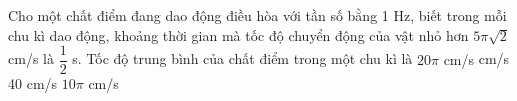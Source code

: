   \begin{ex}%
  	Cho một chất điểm đang dao động điều hòa với tần số bằng 1 Hz, biết trong mỗi chu kì dao động, khoảng thời gian mà tốc độ chuyển động của vật nhỏ hơn $5\pi\sqrt{2}$ cm/s là $\dfrac{1}{2}$ s. Tốc độ trung bình của chất điểm trong một chu kì là
  	\choice
  	{$20\pi$ cm/s}
  	{ cm/s}
  	{40 cm/s}
  	{$10\pi$ cm/s}
  \end{ex} 

